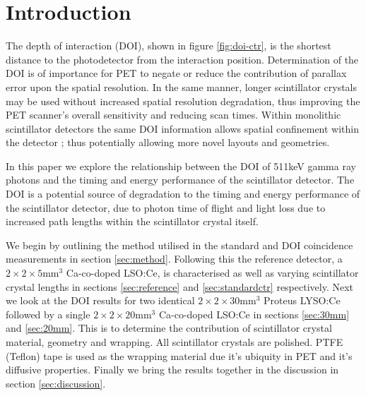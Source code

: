 \section{Introduction} 
The depth of interaction (DOI), shown in figure \ref{fig:doi-ctr}, is the shortest distance to the photodetector from the interaction position. Determination of the DOI is of importance for PET to negate or reduce the contribution of parallax error upon the spatial resolution\cite{Moses_2001}\cite{Humm_Rosenfeld_Del_Guerra_2003}. In the same manner, longer scintillator crystals may be used without increased spatial resolution degradation, thus improving the PET scanner's overall sensitivity and reducing scan times. Within monolithic scintillator detectors the same DOI information allows spatial confinement within the detector \cite{am_Borghi_Seifert_Schaart_2013}\cite{Maas_Bruyndonckx_Schaart_2012}; thus potentially allowing more novel\cite{Dendooven_Lohner_Beekman_2009}\cite{n_der_Lei_van_Dam_Schaart_2013} layouts and geometries.

In this paper we explore the relationship between the DOI of 511keV gamma ray photons and the timing and energy performance of the scintillator detector. The DOI is a potential source of degradation to the timing and energy performance of the scintillator detector, due to photon time of flight and light loss due to increased path lengths within the scintillator crystal itself.

We begin by outlining the method utilised in the standard and DOI coincidence measurements in section \ref{sec:method}. Following this the reference detector, a $2\times2\times5$mm$^3$ Ca-co-doped LSO:Ce, is characterised as well as varying scintillator crystal lengths in sections \ref{sec:reference} and \ref{sec:standardctr} respectively. Next we look at the DOI results for two identical $2\times2\times30$mm$^3$ Proteus LYSO:Ce followed by a single $2\times2\times20$mm$^3$ Ca-co-doped LSO:Ce in sections \ref{sec:30mm} and \ref{sec:20mm}. This is to determine the contribution of scintillator crystal material, geometry and wrapping. All scintillator crystals are polished. PTFE (Teflon) tape is used as the wrapping material due it's ubiquity in PET and it's diffusive properties. Finally we bring the results together in the discussion in section \ref{sec:discussion}.
